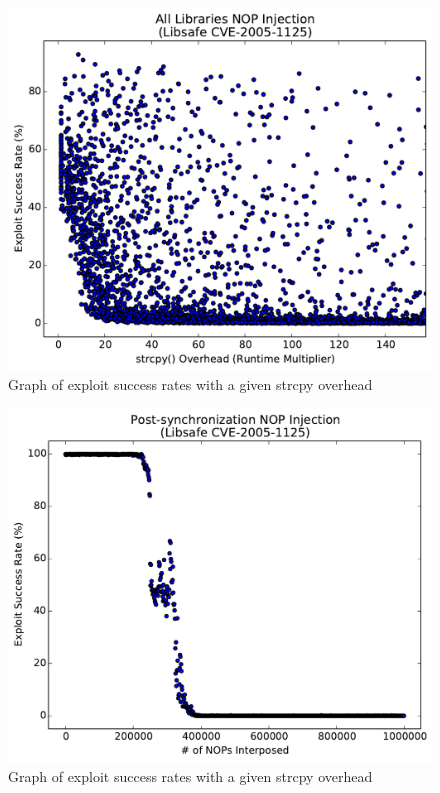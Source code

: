 \documentclass[letterpaper,twocolumn,10pt]{article}
\begin{document}
\begin{figure}
\centering
\includegraphics[width=\columnwidth]{figures/libsafe-all-zoom}
\caption{Graph of exploit success rates with a given strcpy overhead}
\label{fig_libsafe-all-zoom}
\end{figure}

\begin{figure}
\centering
\includegraphics[width=\columnwidth]{figures/libsafe-post}
\caption{Graph of exploit success rates with a given strcpy overhead}
\label{fig_libsafe-post}
\end{figure}
\end{document}
